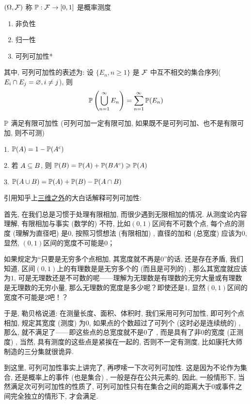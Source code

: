 \begin{definition}[概率测度]\label{def:prob_measure}
    $(\Omega, \mathcal{F})$ 称 $\mathbb{P}: \mathcal{F}\rightarrow [0,1]$ 是概率测度
    \begin{enumerate}
        \item 非负性
        \item 归一性
        \item 可列可加性*
    \end{enumerate}
    其中, 可列可加性的表述为: 设 $\{E_n, n\geq 1\}$ 是 $\mathcal{F}$ 中互不相交的集合序列($E_i\cap E_j=\varnothing, i\neq j$), 则
    \[
    \mathbb{P}\left(\bigcup_{n=1}^{\infty}E_n\right)=\sum_{n=1}^{\infty}\mathbb{P}(E_n)
    \]
\end{definition}

\begin{property}
$\mathbb{P}$ 满足有限可加性 (可列可加一定有限可加, 如果既不是可列可加、也不是有限可加, 则不可测) 
\end{property}

\begin{corollary}\label{cor:set_operation}
    1. $\mathbb{P}(A)=1-\mathbb{P}(A^c)$

    2. 若 $A\subseteq B$, 则 $\mathbb{P}(B)=\mathbb{P}(A)+\mathbb{P}(BA^c)\geqslant \mathbb{P}(A)$

    3. $\mathbb{P}(A\cup B)=\mathbb{P}(A)+\mathbb{P}(B)-\mathbb{P}(A\cap B)$
\end{corollary}

\begin{remark}
    引用知乎上\href{https://www.zhihu.com/question/25836213/answer/1204497999}{三维之外}的大白话解释可列可加性: 

    首先, 在我们总是习惯于处理有限相加, 而很少遇到无限相加的情况. 从测度论内容理解, 有限相加与事实 (数学的) 不符, 比如$(0,1)$区间有不可数个点, 每个点的测度 (理解为直径吧) 是$0$, 按照习惯想法 (有限相加) , 直径的加和 (总宽度) 应该为$0$, 显然, $(0,1)$区间的宽度不可能是$0$；
    
    如果规定为“只要是无穷多个点相加, 其宽度就不再是$0$”的话, 还是存在矛盾, 我们知道, 区间$(0,1)$上的有理数是是无穷多个的 (而且是可列的) , 那么其宽度就应该为$1$, 可是无理数还是不可数的呢——理解为无理数是有理数的无穷大量或有理数是无理数的无穷小量, 那么无理数的宽度是多少呢？即使还是$1$, 显然$(0,1)$区间的宽度不可能是$2$吧！？
    
    于是, 勒贝格说道: 在测量长度、面积、体积时, 我们采用可列可加性, 即可列个点相加, 规定其宽度 (测度) 为$0$, 如果点的个数超过了可列个 (这时必是连续统的) , 那么, 就不满足了——即这些点的总宽度就不是$0$了 , 而是具有了非$0$的宽度 (正测度) , 当然, 具有测度的这些点是紧挨在一起的, 否则不一定有测度, 比如康托大师制造的三分集就很诡异. 
    
    到这里, 可列可加性事实上讲完了, 再啰嗦一下次可列可加性. 这是因为不论作为集合, 还是概率上的事件 (也是集合) , 一般是存在公共元素的, 因此, 一般情形下, 当然满足次可列可加性的性质了, 可列可加性只有在集合之间的距离大于$0$或事件之间完全独立的情形下, 才会满足. 
\end{remark}

